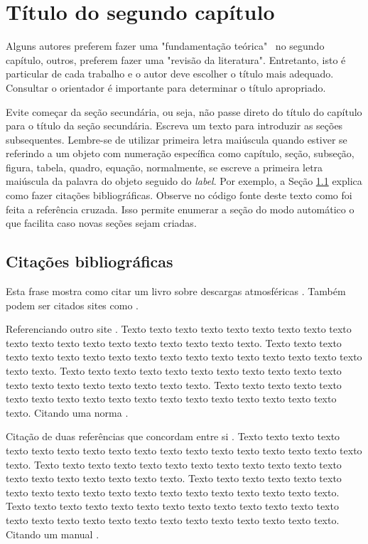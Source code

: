 \chapter{Título do segundo capítulo}
\label{cap:fundamentacao-teorica}

    Alguns autores preferem fazer uma "fundamentação teórica" ~no segundo capítulo, outros, preferem fazer uma "revisão da literatura". Entretanto, isto é particular de cada trabalho e o autor deve escolher o título mais adequado. Consultar o orientador é importante para determinar o título apropriado.

    Evite começar da seção secundária, ou seja, não passe direto do título do capítulo para o título da seção secundária. Escreva um texto para introduzir as seções subsequentes. Lembre-se de utilizar primeira letra maiúscula quando estiver se referindo a um objeto com numeração específica como capítulo, seção, subseção, figura, tabela, quadro, equação, normalmente, se escreve a primeira letra maiúscula da palavra do objeto seguido do \textit{label}. Por exemplo, a Seção \ref{sec:citacoes} explica como fazer citações bibliográficas. Observe no código fonte deste texto como foi feita a referência cruzada. Isso permite enumerar a seção do modo automático o que facilita caso novas seções sejam criadas.  

    \section{Citações bibliográficas}
    \label{sec:citacoes}

        Esta frase mostra como citar um livro sobre descargas atmosféricas \cite{rakov2003lightning}. Também podem ser citados sites como .

        Referenciando outro site \cite{secretaria1999}. Texto texto texto texto texto texto texto texto texto texto texto texto texto texto texto texto texto texto texto. Texto texto texto texto texto texto texto texto texto texto texto texto texto texto texto texto texto texto texto. Texto texto texto texto texto texto texto texto texto texto texto texto texto texto texto texto texto texto texto. Texto texto texto texto texto texto texto texto texto texto texto texto texto texto texto texto texto texto texto. Citando uma norma \cite{NBR10520:1988}.
        
        Citação de duas referências que concordam entre si \cite{lamport1986latex,Maia2011}. Texto texto texto texto texto texto texto texto texto texto texto texto texto texto texto texto texto texto texto. Texto texto texto texto texto texto texto texto texto texto texto texto texto texto texto texto texto texto texto. Texto texto texto texto texto texto texto texto texto texto texto texto texto texto texto texto texto texto texto. Texto texto texto texto texto texto texto texto texto texto texto texto texto texto texto texto texto texto texto texto texto texto texto texto texto texto. Citando um manual \cite{manuais1989}. 
        
